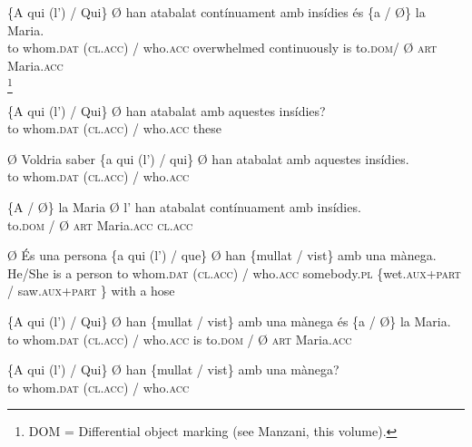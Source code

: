 \documentclass[output=paper,colorlinks,citecolor=brown,nonflat]{./langscibook}
\begin{document}
 \ex \label{ex:royo:16b}
	\gll \{A qui (l’) / Qui\} Ø han atabalat contínuament amb insídies és \{a / Ø\} la Maria.\\
	 to whom.\textsc{dat} (\textsc{cl.acc}) / who.\textsc{acc} overwhelmed continuously is to.\textsc{dom}/ Ø \textsc{art} Maria.\textsc{acc}\\
	\glt {} \footnote{DOM = Differential object marking (see Manzani, this volume).}
	 
 
 \ex \label{ex:royo:16c}
 \gll \{A qui (l’) / Qui\} Ø han atabalat amb aquestes insídies?\\
to whom.\textsc{dat} (\textsc{cl.acc}) / who.\textsc{acc} these    \\
\glt {}
 
 \ex \label{ex:royo:16d}
 \gll Ø Voldria saber \{a qui (l’) / qui\} Ø han atabalat amb aquestes insídies.\\
 to whom.\textsc{dat} (\textsc{cl.acc}) / who.\textsc{acc}   \\
\glt {}
 
\ex \label{ex:royo:16e}
 \gll \{A / Ø\} la Maria Ø l’ han atabalat contínuament amb insídies.\\
 to.\textsc{dom} / Ø \textsc{art} Maria.\textsc{acc} \textsc{cl.acc} \\
\glt {}
 
 \z
 \z


\ea%
 \label{ex:royo:17}
 \ea \label{ex:royo:17a}
 \gll Ø És una persona \{a qui (l’) / que\} Ø han \{mullat / vist\} amb una mànega.\\
He/She is a person to whom.\textsc{dat} (\textsc{cl.acc}) / who.\textsc{acc} somebody.\textsc{pl} \{wet.\textsc{aux}+\textsc{part} / saw.\textsc{aux}+\textsc{part} \} with a hose \\
\glt {}
 
 \ex \label{ex:royo:17b}
 \gll \{A qui (l’) / Qui\} Ø han \{mullat / vist\} amb una mànega és \{a / Ø\} la Maria.\\
 to whom.\textsc{dat} (\textsc{cl.acc}) / who.\textsc{acc} is to.\textsc{dom} / Ø \textsc{art} Maria.\textsc{acc}\\
\glt {}
 
 \ex \label{ex:royo:17c}
 \gll \{A qui (l’) / Qui\} Ø han \{mullat / vist\} amb una mànega?\\
 to whom.\textsc{dat} (\textsc{cl.acc}) / who.\textsc{acc} \\
\glt {}
 
\end{document}
